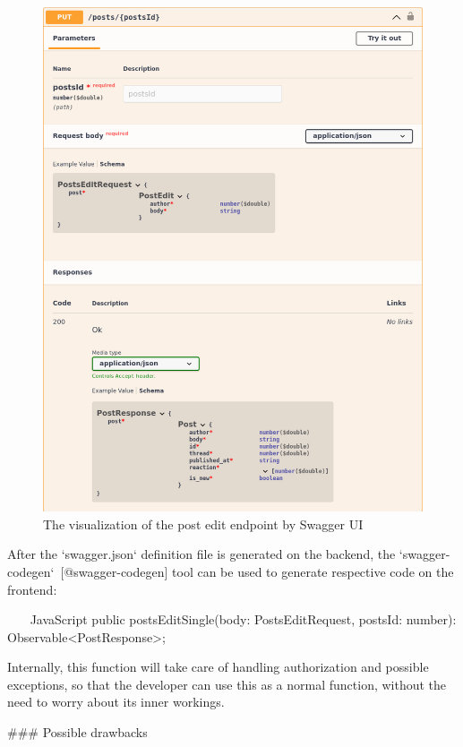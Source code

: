 \documentclass[
  digital, %
  oneside, %
  lof,     %
  lot,     %
]{fithesis4}
\begin{document}
{\begin{figure}
\includegraphics[width=\textwidth]{assets/img/swagger-ui}
\caption{The visualization of the post edit endpoint by Swagger UI}
\label{fig:swagger-ui}
\end{figure}

\mdstart

After the `swagger.json` definition file is generated on the backend, the `swagger-codegen`~[@swagger-codegen] tool can be used to generate respective code on the frontend:

~~~ JavaScript
public postsEditSingle(body: PostsEditRequest, postsId: number): Observable<PostResponse>;
~~~

Internally, this function will take care of handling authorization and possible exceptions, so that the developer can use this as a normal function, without the need to worry about its inner workings.

### Possible drawbacks

}
\end{document}
